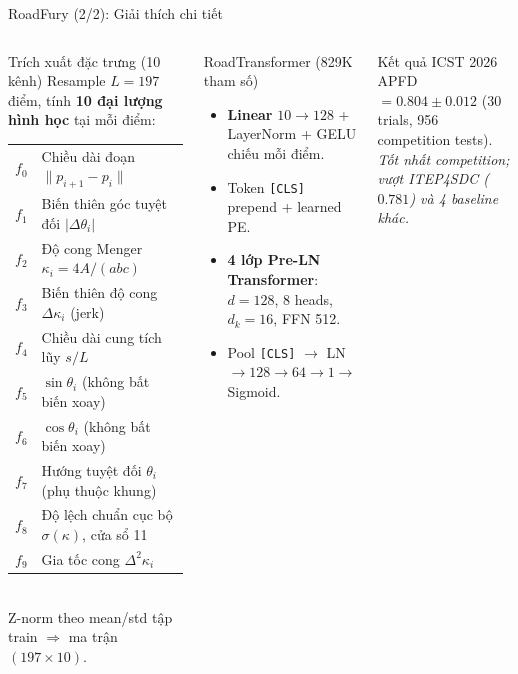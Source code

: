 \documentclass[aspectratio=169,10pt]{beamer}
\begin{document}
\begin{frame}{RoadFury (2/2): Giải thích chi tiết}
\begin{columns}[T]
\begin{block}{Trích xuất đặc trưng (10 kênh)}
\scriptsize
Resample $L{=}197$ điểm, tính \textbf{10 đại lượng hình học} tại mỗi điểm:
\begin{tabular}{@{}ll@{}}
$f_0$ & Chiều dài đoạn $\lVert p_{i+1}{-}p_i\rVert$ \\
$f_1$ & Biến thiên góc tuyệt đối $|\Delta\theta_i|$ \\
$f_2$ & Độ cong Menger $\kappa_i = 4A/(abc)$ \\
$f_3$ & Biến thiên độ cong $\Delta\kappa_i$ (jerk) \\
$f_4$ & Chiều dài cung tích lũy $s/L$ \\
$f_5$ & $\sin\theta_i$ (\alert{không bất biến xoay}) \\
$f_6$ & $\cos\theta_i$ (\alert{không bất biến xoay}) \\
$f_7$ & Hướng tuyệt đối $\theta_i$ (\alert{phụ thuộc khung}) \\
$f_8$ & Độ lệch chuẩn cục bộ $\sigma(\kappa)$, cửa sổ 11 \\
$f_9$ & Gia tốc cong $\Delta^2\kappa_i$ \\
\end{tabular}\\[2pt]
Z-norm theo mean/std tập train $\Rightarrow$ ma trận $(197 \times 10)$.
\end{block}

\begin{block}{RoadTransformer (829K tham số)}
\scriptsize
\begin{itemize}
    \item \textbf{Linear} $10\to128$ + LayerNorm + GELU chiếu mỗi điểm.
    \item Token \texttt{[CLS]} prepend + learned PE.
    \item \textbf{4 lớp Pre-LN Transformer}: $d{=}128$, 8 heads, $d_k{=}16$, FFN 512.
    \item Pool \texttt{[CLS]} $\to$ LN $\to 128\to64\to1\to$ Sigmoid.
\end{itemize}
\end{block}

\begin{exampleblock}{Kết quả ICST 2026}
\small
APFD $= \mathbf{0.804 \pm 0.012}$ (30 trials, 956 competition tests).\\[2pt]
\scriptsize\textit{Tốt nhất competition; vượt ITEP4SDC ($0.781$) và 4 baseline khác.}
\end{exampleblock}
\end{columns}
\end{frame}
\end{document}
